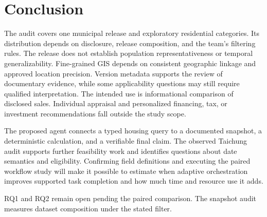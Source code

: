 \section{Conclusion}
\label{sec:conclusion}
The audit covers one municipal release and exploratory residential categories. Its distribution depends on disclosure, release composition, and the team's filtering rules. The release does not establish population representativeness or temporal generalizability. Fine-grained GIS depends on consistent geographic linkage and approved location precision. Version metadata supports the review of documentary evidence, while some applicability questions may still require qualified interpretation. The intended use is informational comparison of disclosed sales. Individual appraisal and personalized financing, tax, or investment recommendations fall outside the study scope.

The proposed agent connects a typed housing query to a documented snapshot, a deterministic calculation, and a verifiable final claim. The observed Taichung audit supports further feasibility work and identifies questions about date semantics and eligibility. Confirming field definitions and executing the paired workflow study will make it possible to estimate when adaptive orchestration improves supported task completion and how much time and resource use it adds.


RQ1 and RQ2 remain open pending the paired comparison. The snapshot audit measures dataset composition under the stated filter.
